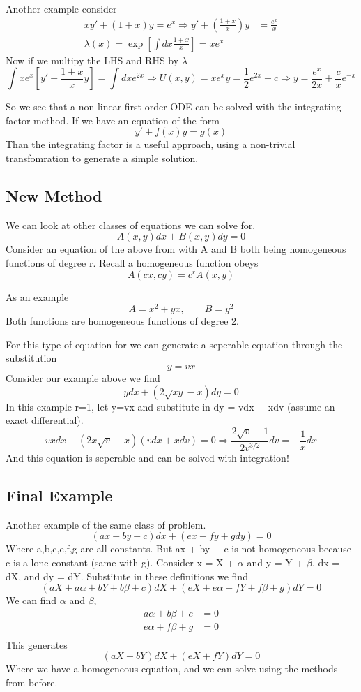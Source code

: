\documentclass{article}
\newcommand{\be}{\begin{equation}}
\newcommand{\ee}{\end{equation}}
\begin{document}
Another example consider
\be
\begin{split}
    xy' + (1+x) y = e^x \Rightarrow y' + \left(\frac{1+x}{x}\right)y &= \frac{e^x}{x}\\
    \lambda(x) = \exp\left[ \int dx \frac{1+x}{x} \right] = xe^x
\end{split}
\ee
Now if we multipy the LHS and RHS by $\lambda$
\be
\int xe^x\left[y' + \frac{1+x}{x} y\right] = \int dx e^{2x} \Rightarrow U(x,y) = xe^xy = \frac{1}{2} e^{2x} + c \Rightarrow y = \frac{e^x}{2x} + \frac{c}{x} e^{-x}
\ee

So we see that a non-linear first order ODE can be solved with the integrating factor method. 
If we have an equation of the form
\be
y' + f(x)y = g(x)
\ee
Than the integrating factor is a useful approach, using a non-trivial transfomration to generate a simple solution. 

\subsection*{New Method}
We can look at other classes of equations we can solve for. 
\be
A(x,y)dx + B(x,y)dy = 0
\ee
Consider an equation of the above from with A and B both being homogeneous functions of degree r.
Recall a homogeneous function obeys
\be
A(cx,cy) = c^r A(x,y)
\ee

As an example 
\be
A = x^2 + yx, \qquad B = y^2
\ee
Both functions are homogeneous functions of degree 2. 

For this type of equation for we can generate a seperable equation through the substitution
\be
y = vx
\ee
Consider our example above we find
\be
ydx + (2\sqrt{xy} - x) dy = 0
\ee
In this example r=1, let y=vx and substitute in dy = vdx + xdv (assume an exact differential). 
\be
vxdx + (2x\sqrt{v} - x) (vdx + xdv) = 0 \Rightarrow \frac{2\sqrt{v}-1}{2v^{3/2}}dv = -\frac{1}{x} dx
\ee
And this equation is seperable and can be solved with integration!

\subsection*{Final Example}
Another example of the same class of problem. 
\be
(ax + by + c) dx + (ex + fy + g dy) = 0
\ee
Where a,b,c,e,f,g are all constants. 
But ax + by + c is not homogeneous because c is a lone constant (same with g). 
Consider x = X + $\alpha$ and y = Y + $\beta$, dx = dX, and dy = dY. 
Substitute in these definitions we find
\be
(aX + a\alpha + bY + b\beta + c) dX + (eX + e\alpha + fY + f\beta + g) dY = 0
\ee
We can find $\alpha$ and $\beta$, 
\be
\begin{split}
    a\alpha + b\beta + c &= 0 \\
    e\alpha + f\beta + g &= 0 \\
\end{split}
\ee
This generates 
\be
(aX + bY)dX + (eX + fY)dY = 0
\ee
Where we have a homogeneous equation, and we can solve using the methods from before.
\end{document}
